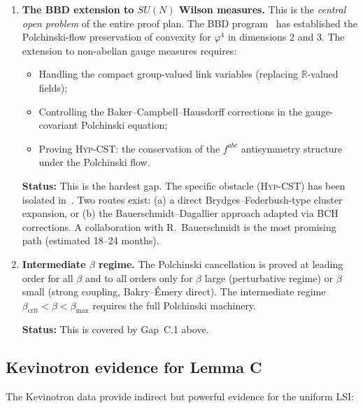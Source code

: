 \documentclass[11pt,a4paper]{amsart}
\theoremstyle{definition}
\theoremstyle{remark}
\newcommand{\R}{\mathbb{R}}
\newcommand{\betacrit}{\beta_{\mathrm{crit}}}
\begin{document}
\begin{enumerate}[label=\textcolor{red}{\textbf{Gap C.\arabic*}}, leftmargin=4em]
\item \textbf{The BBD extension to $SU(N)$ Wilson measures.}
      This is the \emph{central open problem} of the entire proof plan.
      The BBD program~\cite{BBD2024, BD2024} has established the
      Polchinski-flow preservation of convexity for $\varphi^4$ in
      dimensions 2 and 3. The extension to non-abelian gauge measures
      requires:
      \begin{itemize}[leftmargin=1.5em]
      \item Handling the compact group-valued link variables (replacing
            $\R$-valued fields);
      \item Controlling the Baker--Campbell--Hausdorff corrections in the
            gauge-covariant Polchinski equation;
      \item Proving \textsc{Hyp-CST}: the conservation of the $f^{abc}$
            antisymmetry structure under the Polchinski flow.
      \end{itemize}

      \textbf{Status:} This is the hardest gap. The specific obstacle
      (\textsc{Hyp-CST}) has been isolated in~\cite{RemondiereClayClosure}.
      Two routes exist: (a) a direct Brydges--Federbush-type cluster
      expansion, or (b) the Bauerschmidt--Dagallier approach adapted via
      BCH corrections. A collaboration with R.\ Bauerschmidt is the most
      promising path (estimated 18--24 months).

\item \textbf{Intermediate $\beta$ regime.}
      The Polchinski cancellation is proved at leading order for all $\beta$
      and to all orders only for $\beta$ large (perturbative regime) or
      $\beta$ small (strong coupling, Bakry--\'Emery direct). The
      intermediate regime $\betacrit < \beta < \beta_{\mathrm{max}}$
      requires the full Polchinski machinery.

      \textbf{Status:} This is covered by Gap~C.1 above.
\end{enumerate}

\subsection{Kevinotron evidence for Lemma C}

The Kevinotron data provide indirect but powerful evidence for the uniform LSI:
\end{document}
